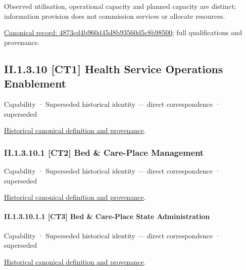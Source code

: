 Observed utilisation, operational capacity and planned capacity are distinct; information provision does not commission services or allocate resources.


{\footnotesize \href{../../../../continuum/strategy/capability/4873cd4b960d45d8b93560d5c8b98500.md}{Canonical record: 4873cd4b960d45d8b93560d5c8b98500}; full qualifications and provenance.}\par
\subsection*{II.1.3.10 [CT1] Health Service Operations Enablement}
\label{navigation:II.1.3.10}

\label{element:a98424298dac46d8b2ddd109d928270a}
{\small Capability · Superseded historical identity — direct correspondence · superseded}\par
\href{../../../../continuum/strategy/capability/a98424298dac46d8b2ddd109d928270a.md}{Historical canonical definition and provenance}.\par
\subsubsection*{II.1.3.10.1 [CT2] Bed \& Care-Place Management}
\label{navigation:II.1.3.10.1}

\label{element:c94d29b7d1c045dabc7814ceea795484}
{\small Capability · Superseded historical identity — direct correspondence · superseded}\par
\href{../../../../continuum/strategy/capability/c94d29b7d1c045dabc7814ceea795484.md}{Historical canonical definition and provenance}.\par
\paragraph*{II.1.3.10.1.1 [CT3] Bed \& Care-Place State Administration}
\label{navigation:II.1.3.10.1.1}

\label{element:dd2e2ee1a68845c087ba93610752181b}
{\small Capability · Superseded historical identity — direct correspondence · superseded}\par
\href{../../../../continuum/strategy/capability/dd2e2ee1a68845c087ba93610752181b.md}{Historical canonical definition and provenance}.\par
